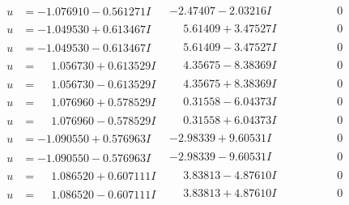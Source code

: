 \documentclass[1p]{elsarticle_modified}
\theoremstyle{definition}
\begin{document}
$$\begin{array}{c|c|c}
\begin{aligned}
u &= -1.076910 - 0.561271 I\end{aligned}
 & -2.47407 - 2.03216 I & \phantom{-0.000000 } 0 \\ \hline\begin{aligned}
u &= -1.049530 + 0.613467 I\end{aligned}
 & \phantom{-}5.61409 + 3.47527 I & \phantom{-0.000000 } 0 \\ \hline\begin{aligned}
u &= -1.049530 - 0.613467 I\end{aligned}
 & \phantom{-}5.61409 - 3.47527 I & \phantom{-0.000000 } 0 \\ \hline\begin{aligned}
u &= \phantom{-}1.056730 + 0.613529 I\end{aligned}
 & \phantom{-}4.35675 - 8.38369 I & \phantom{-0.000000 } 0 \\ \hline\begin{aligned}
u &= \phantom{-}1.056730 - 0.613529 I\end{aligned}
 & \phantom{-}4.35675 + 8.38369 I & \phantom{-0.000000 } 0 \\ \hline\begin{aligned}
u &= \phantom{-}1.076960 + 0.578529 I\end{aligned}
 & \phantom{-}0.31558 - 6.04373 I & \phantom{-0.000000 } 0 \\ \hline\begin{aligned}
u &= \phantom{-}1.076960 - 0.578529 I\end{aligned}
 & \phantom{-}0.31558 + 6.04373 I & \phantom{-0.000000 } 0 \\ \hline\begin{aligned}
u &= -1.090550 + 0.576963 I\end{aligned}
 & -2.98339 + 9.60531 I & \phantom{-0.000000 } 0 \\ \hline\begin{aligned}
u &= -1.090550 - 0.576963 I\end{aligned}
 & -2.98339 - 9.60531 I & \phantom{-0.000000 } 0 \\ \hline\begin{aligned}
u &= \phantom{-}1.086520 + 0.607111 I\end{aligned}
 & \phantom{-}3.83813 - 4.87610 I & \phantom{-0.000000 } 0 \\ \hline\begin{aligned}
u &= \phantom{-}1.086520 - 0.607111 I\end{aligned}
 & \phantom{-}3.83813 + 4.87610 I & \phantom{-0.000000 } 0 \\ \hline\begin{aligned}

\end{aligned}
\end{array}$$
\end{document}
